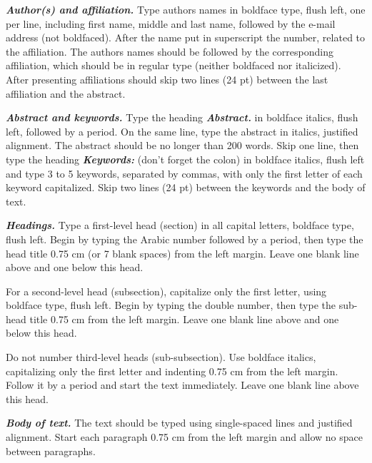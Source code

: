 \documentclass[12pt,fleqn]{article}
\begin{document}
\textbf{\textit{Author(s) and affiliation.}} Type authors names in boldface type, flush left, one per line, including first name, middle and last name, followed by the e-mail address (not boldfaced). After the name put in superscript the number, related to the affiliation. The authors names should be followed by the corresponding affiliation, which should be in regular type (neither boldfaced nor italicized). After presenting affiliations should skip two lines (24 pt) between the last affiliation and the abstract.

\vspace{0.5cm} %

\textbf{\textit{Abstract and keywords.}} Type the heading \textbf{\textit{Abstract.}} in boldface italics, flush left, followed by a period. On the same line, type the abstract in italics, justified alignment. The abstract should be no longer than 200 words. Skip one line, then type the heading \textbf{\textit{Keywords:}} (don't forget the colon) in boldface italics, flush left and type 3 to 5 keywords, separated by commas, with only the first letter of each keyword capitalized. Skip two lines (24 pt) between the keywords and the body of text.

\vspace{0.5cm} %

\textbf{\textit{Headings.}} Type a first-level head (section) in all capital letters, boldface type, flush left. Begin by typing the Arabic number followed by a period, then type the head title 0.75 cm (or 7 blank spaces) from the left margin. Leave one blank line above and one below this head. 

For a second-level head (subsection), capitalize only the first letter, using boldface type, flush left. Begin by typing the double number, then type the sub-head title 0.75 cm from the left margin. Leave one blank line above and one below this head. 

Do not number third-level heads (sub-subsection). Use boldface italics, capitalizing only the first letter and indenting 0.75 cm from the left margin. Follow it by a period and start the text immediately. Leave one blank line above this head.

\vspace{0.5cm} %
% 
\textbf{\textit{Body of text.}} The text should be typed using single-spaced lines and justified alignment. Start each paragraph 0.75 cm from the left margin and allow no space between paragraphs.
\end{document}
